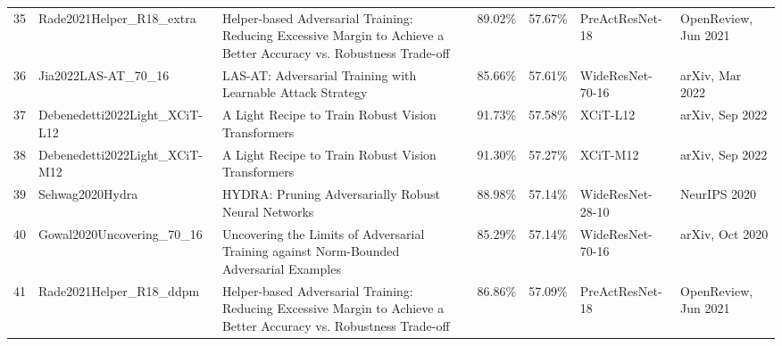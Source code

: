 \begin{table}[]
\begin{tabular}{lllllll}
    35 & Rade2021Helper\_R18\_extra               & Helper-based Adversarial Training: Reducing Excessive Margin to Achieve a Better Accuracy vs. Robustness Trade-off & 89.02\%        & 57.67\%         & PreActResNet-18                                                   & OpenReview, Jun 2021                                       \\
    36 & Jia2022LAS-AT\_70\_16                    & LAS-AT: Adversarial Training with Learnable Attack Strategy                                                        & 85.66\%        & 57.61\%         & WideResNet-70-16                                                  & arXiv, Mar 2022                                            \\
    37 & Debenedetti2022Light\_XCiT-L12           & A Light Recipe to Train Robust Vision Transformers                                                                 & 91.73\%        & 57.58\%         & XCiT-L12                                                          & arXiv, Sep 2022                                            \\
    38 & Debenedetti2022Light\_XCiT-M12           & A Light Recipe to Train Robust Vision Transformers                                                                 & 91.30\%        & 57.27\%         & XCiT-M12                                                          & arXiv, Sep 2022                                            \\
    39 & Sehwag2020Hydra                          & HYDRA: Pruning Adversarially Robust Neural Networks                                                                & 88.98\%        & 57.14\%         & WideResNet-28-10                                                  & NeurIPS 2020                                               \\
    40 & Gowal2020Uncovering\_70\_16              & Uncovering the Limits of Adversarial Training against Norm-Bounded Adversarial Examples                            & 85.29\%        & 57.14\%         & WideResNet-70-16                                                  & arXiv, Oct 2020                                            \\
    41 & Rade2021Helper\_R18\_ddpm                & Helper-based Adversarial Training: Reducing Excessive Margin to Achieve a Better Accuracy vs. Robustness Trade-off & 86.86\%        & 57.09\%         & PreActResNet-18                                                   & OpenReview, Jun 2021                                       \\

\end{tabular}
\end{table}
